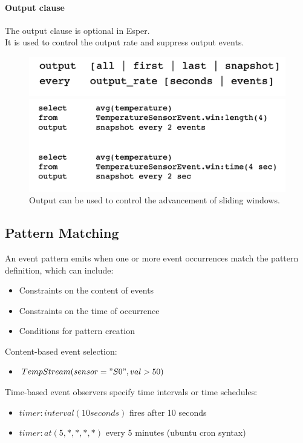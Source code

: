 \documentclass[10pt,a4paper]{article}
\begin{document}
\paragraph{Output clause} The output clause is optional in Esper. \\ It is used to control the output rate and suppress output events.

\begin{figure}[ht!]
\begin{minipage}{.5\textwidth}
  \centering
  \includegraphics[width=.9\linewidth]{images/output-syntax}
\end{minipage}%
\begin{minipage}{.5\textwidth}
  \centering
  \includegraphics[width=.9\linewidth]{images/output-example}
\end{minipage}
\caption{Output can be used to control the advancement of sliding windows.}
\end{figure}

\subsection{Pattern Matching}
An event pattern emits when one or more event occurrences match the pattern definition, which can include:
\begin{itemize}
	\item Constraints on the content of events
	\item Constraints on the time of occurrence
	\item Conditions for pattern creation
\end{itemize}
Content-based event selection:
\begin{itemize}
	\item $TempStream(sensor="S0", val>50)$
\end{itemize}
Time-based event observers specify time intervals or time schedules:
\begin{itemize}
	\item $timer:interval(10 seconds)$ fires after 10 seconds
	\item $timer:at(5, *, *, *, *)$ every 5 minutes (ubuntu cron syntax)
\end{itemize}
\end{document}
